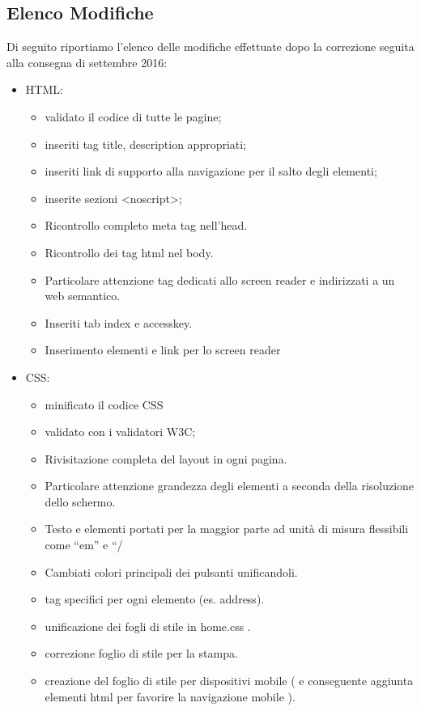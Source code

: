 \subsection{Elenco Modifiche}{
	Di seguito riportiamo l'elenco delle modifiche effettuate dopo la correzione seguita alla consegna di settembre 2016:
	\begin{itemize}\itemsep1pt
		\item HTML:
		\begin{itemize}\itemsep1pt
			\item validato il codice di tutte le pagine;
			\item inseriti tag title, description appropriati;
			\item inseriti link di supporto alla navigazione per il salto degli elementi;
			\item inserite sezioni <noscript>;
			\item Ricontrollo completo meta tag nell’head.
			\item Ricontrollo dei tag html nel body.
			\item Particolare attenzione tag dedicati allo screen reader e indirizzati a un web semantico.
			\item Inseriti tab index e accesskey.
			\item Inserimento elementi e link per lo screen reader
		\end{itemize}
		\item CSS:
		\begin{itemize}\itemsep1pt
			\item minificato il codice CSS
			\item validato con i validatori W3C;
			\item Rivisitazione completa del layout in ogni pagina.
			\item Particolare attenzione grandezza degli elementi a seconda della risoluzione dello schermo.
			\item Testo e elementi portati per la maggior parte ad unità di misura flessibili come “em” e “/%
			\item Cambiati colori principali dei pulsanti unificandoli.
			\item tag specifici per ogni elemento (es. address).
			\item unificazione dei fogli di stile in home.css .
			\item correzione foglio di stile per la stampa.
			\item creazione del foglio di stile per dispositivi mobile ( e conseguente aggiunta elementi html per favorire la navigazione mobile ).

\end{itemize}
\end{itemize}}
